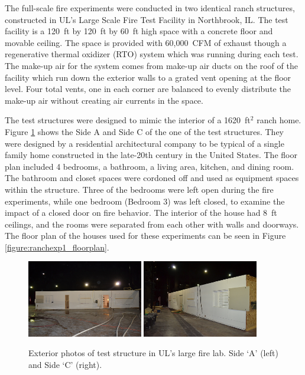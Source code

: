 \documentclass[12pt,oneside]{book}
\begin{document}
The full-scale fire experiments were conducted in two identical ranch structures, constructed in UL's Large Scale Fire Test Facility in Northbrook, IL. The test facility is a 120~ft by 120~ft by 60~ft high space with a concrete floor and movable ceiling. The space is provided with 60,000~CFM of exhaust though a regenerative thermal oxidizer (RTO) system which was running during each test. The make-up air for the system comes from make-up air ducts on the roof of the facility which run down the exterior walls to a grated vent opening at the floor level. Four total vents, one in each corner are balanced to evenly distribute the make-up air without creating air currents in the space. 

The test structures were designed to mimic the interior of a 1620~ft$^2$ ranch home. Figure \ref{fig:test_prop_photo} shows the Side A and Side C of the one of the test structures. They were designed by a residential architectural company to be typical of a single family home constructed in the late-20th century in the United States. The floor plan included 4 bedrooms, a bathroom, a living area, kitchen, and dining room. The bathroom and closet spaces were cordoned off and used as equipment spaces within the structure. Three of the bedrooms were left open during the fire experiments, while one bedroom (Bedroom 3) was left closed, to examine the impact of a closed door on fire behavior. The interior of the house had 8~ft ceilings, and the rooms were separated from each other with walls and doorways. The floor plan of the houses used for these experiments can be seen in Figure \ref{figure:ranchexp1_floorplan}.

\begin{figure}[H]
\centering
\includegraphics[width=0.45\textwidth]{0_Images/Ranch_Pictures/House_Front.jpg}
\includegraphics[width=0.45\textwidth]{0_Images/Ranch_Pictures/House_Rear.jpg}
\caption[Test Structure - Exterior Photos]{Exterior photos of test structure in UL's large fire lab. Side `A' (left) and Side `C' (right).}
\label{fig:test_prop_photo}
\end{figure}
\end{document}

